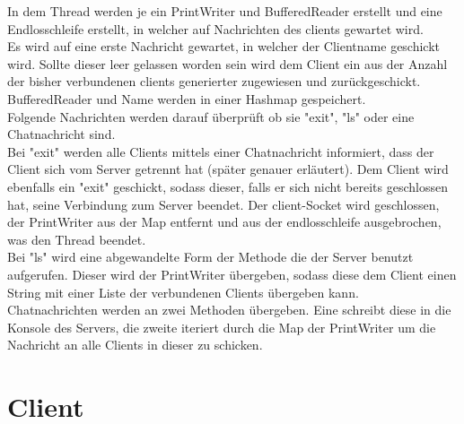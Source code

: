 \documentclass{article}
\begin{document}
In dem Thread werden je ein PrintWriter und BufferedReader erstellt und eine Endlosschleife erstellt, in welcher auf Nachrichten des clients gewartet wird.\\
Es wird auf eine erste Nachricht gewartet, in welcher der Clientname geschickt wird. Sollte dieser leer gelassen worden sein wird dem Client ein aus der Anzahl der bisher verbundenen clients generierter zugewiesen und zurückgeschickt. BufferedReader und Name werden in einer Hashmap gespeichert.\\
Folgende Nachrichten werden darauf überprüft ob sie "exit", "ls" oder eine Chatnachricht sind.\\
Bei "exit" werden alle Clients mittels einer Chatnachricht informiert, dass der Client sich vom Server getrennt hat (später genauer erläutert). Dem Client wird ebenfalls ein "exit" geschickt, sodass dieser, falls er sich nicht bereits geschlossen hat, seine Verbindung zum Server beendet. Der client-Socket wird geschlossen, der PrintWriter aus der Map entfernt und aus der endlosschleife ausgebrochen, was den Thread beendet.\\
Bei "ls" wird eine abgewandelte Form der Methode die der Server benutzt aufgerufen. Dieser wird der PrintWriter übergeben, sodass diese dem Client einen String mit einer Liste der verbundenen Clients übergeben kann.\\
Chatnachrichten werden an zwei Methoden übergeben. Eine schreibt diese in die Konsole des Servers, die zweite iteriert durch die Map der PrintWriter um die Nachricht an alle Clients in dieser zu schicken.\\



\newpage\section{Client}
\end{document}
